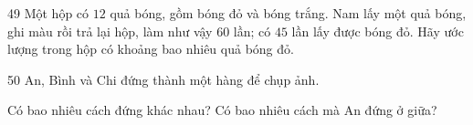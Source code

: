 \gap
\begin{probbox}{49}{}
Một hộp có $12$ quả bóng, gồm bóng đỏ và bóng trắng. Nam lấy một quả bóng, ghi màu rồi trả lại hộp, làm như vậy $60$ lần; có $45$ lần lấy được bóng đỏ. Hãy ước lượng trong hộp có khoảng bao nhiêu quả bóng đỏ.
\end{probbox}
\gap
\begin{probbox}{50}{}
An, Bình và Chi đứng thành một hàng để chụp ảnh.\par
{} Có bao nhiêu cách đứng khác nhau? \quad {} Có bao nhiêu cách mà An đứng ở giữa?
\end{probbox}
